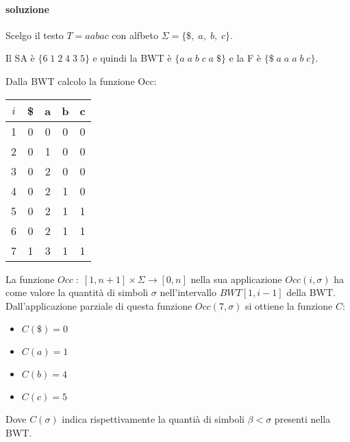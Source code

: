 \paragraph{soluzione} Scelgo il testo $T = aabac$ con alfbeto $\Sigma = \{\$, \; a, \; b, \; c\}$.

Il SA \`e $\{6 \; 1 \; 2 \; 4 \; 3 \; 5\}$ e quindi la BWT \`e $\{a \; a \; b \; c \; a \; \$\}$ e la F \`e $\{\$ \; a \; a \; a \; b \; c\}$.

Dalla BWT calcolo la funzione Occ:

\begin{center}
  \begin{tabular}{|c | c | c | c | c|}
    \hline
    $i$ & \$ & a & b & c \\ \hline
    1 & 0 & 0 & 0 & 0 \\ \hline
    2 & 0 & 1 & 0 & 0 \\ \hline
    3 & 0 & 2 & 0 & 0 \\ \hline
    4 & 0 & 2 & 1 & 0 \\ \hline
    5 & 0 & 2 & 1 & 1 \\ \hline
    6 & 0 & 2 & 1 & 1 \\ \hline
    7 & 1 & 3 & 1 & 1 \\ \hline
  \end{tabular}
\end{center}

La funzione $Occ \; : \; [1,n+1] \times \Sigma \rightarrow [0,n]$ nella sua applicazione $Occ(i, \sigma)$ ha come valore la quantit\`a di simboli $\sigma$ nell'intervallo $BWT[1,i-1]$ della BWT.
Dall'applicazione parziale di questa funzione $Occ(7, \sigma)$ si ottiene la funzione $C$:

\begin{itemize}
  \item $C(\$) = 0$
  \item $C(a) = 1$
  \item $C(b) = 4$
  \item $C(c) = 5$
\end{itemize}

Dove $C(\sigma)$ indica rispettivamente la quanti\`a di simboli $\beta < \sigma$ presenti nella BWT.
